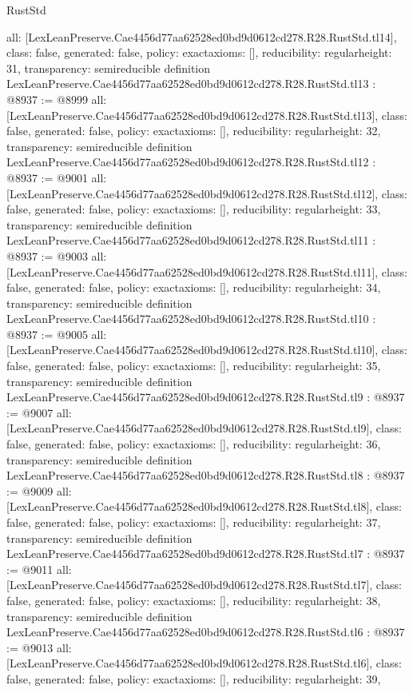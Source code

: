 \begin{lexlean}{RustStd}
\begin{coremodule}
{  all: [LexLeanPreserve.Cae4456d77aa62528ed0bd9d0612cd278.R28.RustStd.tl14],
  class: false,
  generated: false,
  policy: exact{axioms: []},
  reducibility: regular{height: 31},
  transparency: semireducible
}
definition LexLeanPreserve.Cae4456d77aa62528ed0bd9d0612cd278.R28.RustStd.tl13 : @8937 := @8999 {
  all: [LexLeanPreserve.Cae4456d77aa62528ed0bd9d0612cd278.R28.RustStd.tl13],
  class: false,
  generated: false,
  policy: exact{axioms: []},
  reducibility: regular{height: 32},
  transparency: semireducible
}
definition LexLeanPreserve.Cae4456d77aa62528ed0bd9d0612cd278.R28.RustStd.tl12 : @8937 := @9001 {
  all: [LexLeanPreserve.Cae4456d77aa62528ed0bd9d0612cd278.R28.RustStd.tl12],
  class: false,
  generated: false,
  policy: exact{axioms: []},
  reducibility: regular{height: 33},
  transparency: semireducible
}
definition LexLeanPreserve.Cae4456d77aa62528ed0bd9d0612cd278.R28.RustStd.tl11 : @8937 := @9003 {
  all: [LexLeanPreserve.Cae4456d77aa62528ed0bd9d0612cd278.R28.RustStd.tl11],
  class: false,
  generated: false,
  policy: exact{axioms: []},
  reducibility: regular{height: 34},
  transparency: semireducible
}
definition LexLeanPreserve.Cae4456d77aa62528ed0bd9d0612cd278.R28.RustStd.tl10 : @8937 := @9005 {
  all: [LexLeanPreserve.Cae4456d77aa62528ed0bd9d0612cd278.R28.RustStd.tl10],
  class: false,
  generated: false,
  policy: exact{axioms: []},
  reducibility: regular{height: 35},
  transparency: semireducible
}
definition LexLeanPreserve.Cae4456d77aa62528ed0bd9d0612cd278.R28.RustStd.tl9 : @8937 := @9007 {
  all: [LexLeanPreserve.Cae4456d77aa62528ed0bd9d0612cd278.R28.RustStd.tl9],
  class: false,
  generated: false,
  policy: exact{axioms: []},
  reducibility: regular{height: 36},
  transparency: semireducible
}
definition LexLeanPreserve.Cae4456d77aa62528ed0bd9d0612cd278.R28.RustStd.tl8 : @8937 := @9009 {
  all: [LexLeanPreserve.Cae4456d77aa62528ed0bd9d0612cd278.R28.RustStd.tl8],
  class: false,
  generated: false,
  policy: exact{axioms: []},
  reducibility: regular{height: 37},
  transparency: semireducible
}
definition LexLeanPreserve.Cae4456d77aa62528ed0bd9d0612cd278.R28.RustStd.tl7 : @8937 := @9011 {
  all: [LexLeanPreserve.Cae4456d77aa62528ed0bd9d0612cd278.R28.RustStd.tl7],
  class: false,
  generated: false,
  policy: exact{axioms: []},
  reducibility: regular{height: 38},
  transparency: semireducible
}
definition LexLeanPreserve.Cae4456d77aa62528ed0bd9d0612cd278.R28.RustStd.tl6 : @8937 := @9013 {
  all: [LexLeanPreserve.Cae4456d77aa62528ed0bd9d0612cd278.R28.RustStd.tl6],
  class: false,
  generated: false,
  policy: exact{axioms: []},
  reducibility: regular{height: 39},
}
\end{coremodule}
\end{lexlean}
